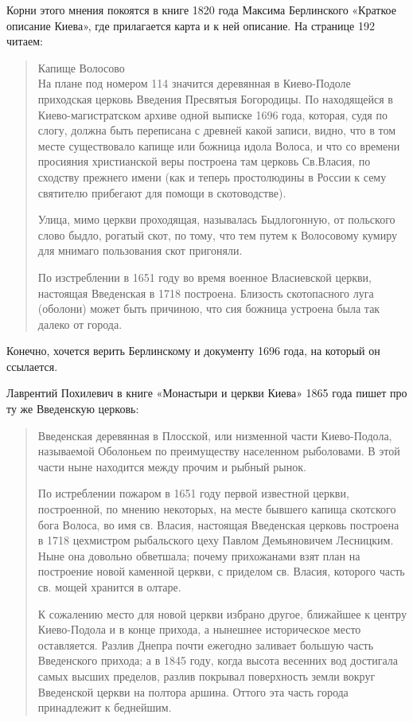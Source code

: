 \documentclass[a5paper,11pt,openany]{article}
\begin{document}
Корни этого мнения покоятся в книге 1820 года Максима Берлинского «Краткое описание Киева», где прилагается карта и к ней описание. На странице 192 читаем:

\begin{quotation}
Капище Волосово\\

На плане под номером 114 значится деревянная в Киево-Подоле приходская церковь Введения Пресвятыя Богородицы. По находящейся в Киево-магистратском архиве одной выписке 1696 года, которая, судя по слогу, должна быть переписана с древней какой записи, видно, что в том месте существовало капище или божница идола Волоса, и что со времени просияния христианской веры построена там церковь Св.Власия, по сходству прежнего имени (как и теперь простолюдины в России к сему святителю прибегают для помощи в скотоводстве).

  Улица, мимо церкви проходящая, называлась Быдлогонную, от польского слово быдло, рогатый скот, по тому, что тем путем к Волосовому кумиру для мнимаго пользования скот пригоняли.

   По изстреблении в 1651 году во время военное Власиевской церкви, настоящая Введенская в 1718 построена. Близость скотопасного луга (оболони) может быть причиною, что сия божница устроена была так далеко от города.
\end{quotation}

   Конечно, хочется верить Берлинскому и документу 1696 года, на который он ссылается.  

Лаврентий Похилевич в книге «Монастыри и церкви Киева» 1865 года пишет про ту же Введенскую церковь:

\begin{quotation}
\noindent Введенская деревянная в Плосской, или низменной части Киево-Подола, называемой Оболоньем по преимуществу населенном рыболовами. В этой части ныне находится между прочим и рыбный рынок.

По истреблении пожаром в 1651 году первой известной церкви, построенной, по мнению некоторых, на месте бывшего капища скотского бога Волоса, во имя св. Власия, настоящая Введенская церковь построена в 1718 цехмистром рыбальского цеху Павлом Демьяновичем Лесницким. Ныне она довольно обветшала; почему прихожанами взят план на построение новой каменной церкви, с приделом св. Власия, которого часть св. мощей хранится в олтаре.

К сожалению место для новой церкви избрано другое, ближайшее к центру Киево-Подола и в конце прихода, а нынешнее историческое место оставляется. Разлив Днепра почти ежегодно заливает большую часть Введенского прихода; а в 1845 году, когда высота весенних вод достигала самых высших пределов, разлив покрывал поверхность земли вокруг Введенской церкви на полтора аршина. Оттого эта часть города принадлежит к беднейшим.\end{quotation}
\end{document}
